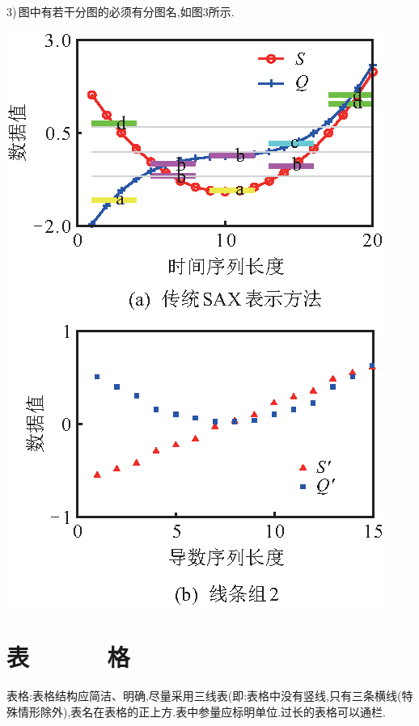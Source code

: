 \documentclass{ctacn}%
\begin{document}
\begin{multicols}{2}
3)\,图中有若干分图的必须有分图名,如图3所示.
\begin{center}
	\includegraphics[scale=1,trim=0 0 0 0]{template-3}\\
	\label{Fig1}
\end{center}



\section{表~~~~~~格}
表格:表格结构应简洁、明确,尽量采用三线表(即:表格中没有竖线,只有三条横线(特殊情形除外),表名在表格的正上方.\;表中参量应标明单位.\;过长的表格可以通栏.


\end{multicols}
\end{document}
